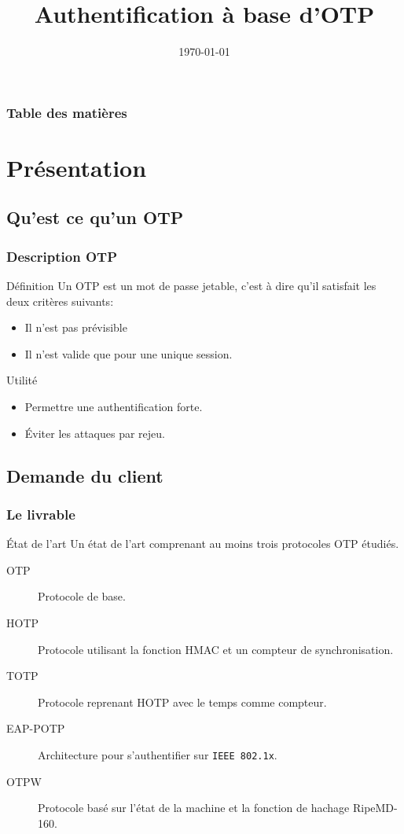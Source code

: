 \documentclass[xcolor=table]{beamer}
\title[M1SSI]{Authentification \`{a} base d'OTP}
\institute[Université de Rouen] {
Université de Rouen \\
\medskip
}
\date{\today}
\begin{document}
\begin{frame}
\titlepage
\end{frame}

\begin{frame}
\frametitle{Table des matières}
\tableofcontents
\end{frame}

\section{Présentation}

\subsection{Qu'est ce qu'un OTP}

\begin{frame}
\frametitle{Description OTP}
\begin{block}{Définition}
    Un OTP est un mot de passe jetable, c'est à dire qu'il satisfait les deux 
  critères suivants:
  \begin{itemize}
    \item Il n'est pas prévisible
    \item Il n'est valide que pour une unique session.
  \end{itemize}
\end{block}

\begin{block}{Utilité}
  \begin{itemize}
    \item Permettre une authentification forte.
    \item Éviter les attaques par rejeu.
  \end{itemize}
\end{block}
\end{frame}

\subsection{Demande du client}

\begin{frame}
\frametitle{Le livrable}
\begin{block}{État de l'art} 
Un état de l'art comprenant au moins trois protocoles OTP étudiés.
\begin{description}
 \item[OTP] Protocole de base.
 \item[HOTP] Protocole utilisant la fonction HMAC et un compteur de 
  synchronisation.
 \item[TOTP] Protocole reprenant HOTP avec le temps comme compteur.
 \item[EAP-POTP] Architecture pour s'authentifier sur \verb?IEEE 802.1x?. 
 \item[OTPW] Protocole basé sur l'état de la machine et la fonction de hachage RipeMD-160.
\end{description}
\end{block}
\end{frame}
\end{document}
